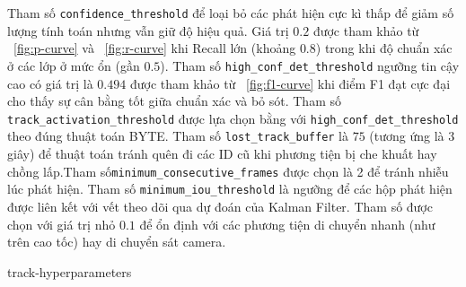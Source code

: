 Tham số \texttt{confidence\_threshold} để loại bỏ các phát hiện cực kì thấp để
giảm số lượng tính toán nhưng vẫn giữ độ hiệu quả. Giá trị $0.2$ được tham khảo
từ \figurename~\ref{fig:p-curve} và \figurename~\ref{fig:r-curve} khi Recall
lớn (khoảng $0.8$) trong khi độ chuẩn xác ở các lớp ở mức ổn (gần $0.5$). Tham
số \texttt{high\_conf\_det\_threshold} ngưỡng tin cậy cao có giá trị là $0.494$
được tham khảo từ \figurename~\ref{fig:f1-curve} khi điểm F1 đạt cực đại cho
thấy sự cân bằng tốt giữa chuẩn xác và bỏ sót. Tham số
\texttt{track\_activation\_threshold} được lựa chọn bằng với
\texttt{high\_conf\_det\_threshold} theo đúng thuật toán BYTE. Tham số
\texttt{lost\_track\_buffer} là $75$ (tương ứng là 3 giây) để thuật toán tránh
quên đi các ID cũ khi phương tiện bị che khuất hay chồng lấp.Tham
số\texttt{minimum\_consecutive\_frames} được chọn là 2 để tránh nhiễu lúc phát
hiện. Tham số \texttt{minimum\_iou\_threshold} là ngưỡng để các hộp phát hiện
được liên kết với vết theo dõi qua dự đoán của Kalman Filter. Tham số được chọn
với giá trị nhỏ $0.1$ để ổn định với các phương tiện di chuyển nhanh (như trên
cao tốc) hay di chuyển sát camera.

\begin{table}[htbp]
  \centering
  \caption{Các siêu tham số cho thuật toán SORT và BYTE}
  \label{tab:track-hyperparameters}
  {track-hyperparameters}
\end{table}
